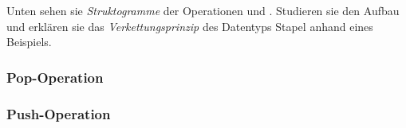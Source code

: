 Unten sehen sie \emph{Struktogramme} der Operationen  und . Studieren sie den Aufbau und erklären sie das \emph{Verkettungsprinzip} des Datentyps Stapel anhand eines Beispiels.

\subsubsection*{Pop-Operation}

\subsubsection*{Push-Operation}
